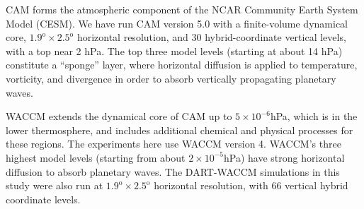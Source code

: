 CAM \citep{nealeetal2010} forms the atmospheric component of the NCAR Community Earth System Model (CESM). 
We have run CAM version 5.0 with a finite-volume dynamical core, $1.9^{\text{o}} \times 2.5^{\text{o}}$ horizontal resolution, and  30 hybrid-coordinate vertical levels, with a top near 2 hPa.
The top three model levels (starting at about 14 hPa) constitute a ``sponge'' layer, where horizontal diffusion is applied to temperature, vorticity, and divergence in order to absorb vertically propagating planetary waves.  

WACCM \citep{Marsh2013} extends the dynamical core of CAM up to $5 \times 10^{-6}$hPa, which is in the lower thermosphere, and includes additional chemical and physical processes for these regions. 
The experiments here use WACCM version 4.
WACCM's three highest model levels (starting from about $2 \times 10^{-5}$hPa) have strong horizontal diffusion to absorb planetary waves. 
The DART-WACCM simulations in this study were also run at $1.9^{\text{o}} \times 2.5^{\text{o}}$ horizontal resolution, with 66 vertical hybrid coordinate levels. 

